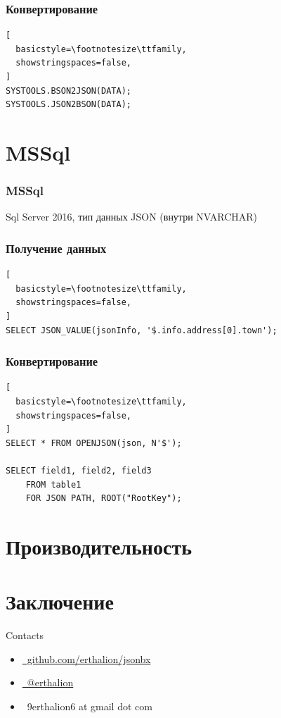 \documentclass[14pt, compress, aspectratio=169]{beamer}
\def\twitter{{\FA \faTwitter}}
\def\github{{\FA \faGithubSign}}
\def\email{{\FA \faEnvelope}}
\begin{document}
\begin{frame}[fragile]
  \frametitle{Конвертирование}

  \vspace{-20pt}
\begin{lstlisting}[
  basicstyle=\footnotesize\ttfamily,
  showstringspaces=false,
]
SYSTOOLS.BSON2JSON(DATA);
SYSTOOLS.JSON2BSON(DATA);
\end{lstlisting}

\end{frame}

\section{MSSql}

\begin{frame}[fragile]
    \frametitle{MSSql}

    Sql Server 2016, тип данных JSON (внутри NVARCHAR)
\end{frame}
 
\begin{frame}[fragile]
  \frametitle{Получение данных}

\begin{lstlisting}[
  basicstyle=\footnotesize\ttfamily,
  showstringspaces=false,
]
SELECT JSON_VALUE(jsonInfo, '$.info.address[0].town');
\end{lstlisting}

\end{frame}

\begin{frame}[fragile]
  \frametitle{Конвертирование}

  \vspace{-20pt}
\begin{lstlisting}[
  basicstyle=\footnotesize\ttfamily,
  showstringspaces=false,
]
SELECT * FROM OPENJSON(json, N'$');

SELECT field1, field2, field3
    FROM table1
    FOR JSON PATH, ROOT("RootKey");
\end{lstlisting}

\end{frame}

\section{Производительность}

\section{Заключение}

\begin{frame}{Contacts}
    \begin{itemize}[label={}]
        \item \href{https://github.com/erthalion/jsonbx}{\github\ github.com/erthalion/jsonbx}
        \item \href{http://twitter.com/erthalion}{\twitter\ @erthalion}
        \item \email\ 9erthalion6 at gmail dot com
    \end{itemize}
\end{frame}

\end{document}
